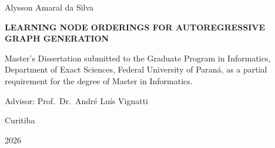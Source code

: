\documentclass[12pt,a4paper,oneside]{report}
\newcommand{\thesistitle}{Learning Node Orderings for Autoregressive Graph Generation}
\newcommand{\thesisauthor}{Alysson Amaral da Silva}
\newcommand{\thesisyear}{2026}
\newcommand{\thesiscity}{Curitiba}
\newcommand{\advisorname}{Prof.\ Dr.\ Andr\'e Lu\'is Vignatti}
\begin{document}

\begin{titlepage}
    \thispagestyle{empty}
    \centering

    {\Large \thesisauthor \par}

    \vspace{3cm}

    {\bfseries\LARGE \MakeUppercase{\thesistitle}\par}

    \vspace{2cm}

    {\large
    Master's Dissertation submitted to the Graduate Program in Informatics,
    Department of Exact Sciences, Federal University of Paran\'a,
    as a partial requirement for the degree of Master in Informatics.\par}

    \vspace{1cm}

    {\large Advisor: \advisorname\par}

    \vfill

    {\large \thesiscity\par}
    {\large \thesisyear\par}
\end{titlepage}

\setcounter{page}{1}
\end{document}
